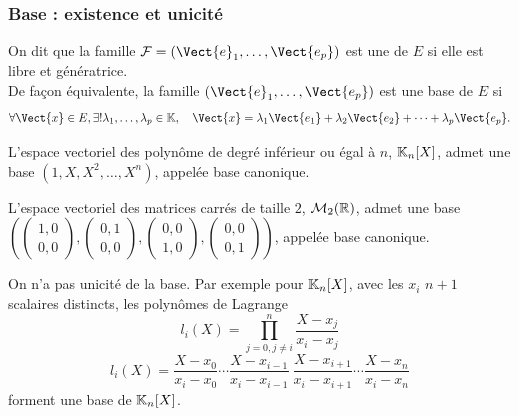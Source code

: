 \documentclass{book}
\begin{document}
\subsubsection{Base : existence et unicité}
\begin{Definition}
On dit que la famille $\mathcal{F}=(\Vect{e}_1,\dots,\Vect{e_p})$ est une  de $E$ si elle est libre et génératrice.\\
De façon équivalente, la famille $(\Vect{e}_1,\dots,\Vect{e_p})$ est une base de $E$ si
\[ \forall \Vect{x}\in E, \exists !  \lambda_1,\dots,\lambda_p   \in \K ,\quad  \Vect{x} = \lambda_1 \Vect{e_1}+ \lambda_2 \Vect{e_2}+\dots +\lambda_p \Vect{e_p}. \]
\end{Definition}
\begin{Exemple}
L'espace vectoriel des polynôme de degré inférieur ou égal à $n$, $\mathbb{K} _n[X]$,  admet une base $(1,X,X^2,\dots,X^n)$, appelée base canonique.
\end{Exemple}
\begin{Exemple}
L'espace vectoriel des matrices carrés de taille $2$, $\mathcal{M}_{2}(\mathbb{R})$,  admet une base $(\begin{pmatrix}1,0\\0,0\end{pmatrix},\begin{pmatrix}0,1\\0,0\end{pmatrix},\begin{pmatrix}0,0\\1,0\end{pmatrix},\begin{pmatrix}0,0\\0,1\end{pmatrix} )$, appelée base canonique.
\end{Exemple} 
 
\begin{Remarque} On n'a pas unicité de la base. Par exemple pour $\mathbb{K} _n[X]$, avec les $x_i$ $n+1$ scalaires distincts, les polynômes de Lagrange 
$$ l_{i}(X)=\prod _{j=0,j\neq i}^{n}{\frac {X-x_{j}}{x_{i}-x_{j}}} $$
$$l_{i}(X)={\frac {X-x_{0}}{x_{i}-x_{0}}}\cdots {\frac {X-x_{i-1}}{x_{i}-x_{i-1}}}~{\frac {X-x_{i+1}}{x_{i}-x_{i+1}}}\cdots {\frac {X-x_{n}}{x_{i}-x_{n}}}$$   forment une base de $\mathbb{K} _n[X]$.
\end{Remarque}
\end{document}
